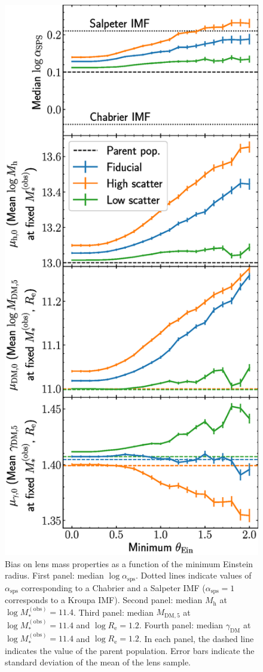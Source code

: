\documentclass{aa}
\def\reff{R_{\mathrm{e}}}
\def\asps{\alpha_{\mathrm{sps}}}
\def\mobs{M_*^{(\mathrm{obs})}}
\def\gammadm{\gamma_{\mathrm{DM}}}
\def\mdmfive{M_{\mathrm{DM}, 5}}
\def\mhalo{M_{\mathrm{h}}}
\begin{document}
\begin{figure}
\includegraphics[width=\columnwidth]{lens_mass_bias.eps}
\caption{
Bias on lens mass properties as a function of the minimum Einstein radius.
First panel: median $\log{\asps}$. Dotted lines indicate values of $\asps$ corresponding to a Chabrier and a Salpeter IMF ($\asps=1$ corresponds to a Kroupa IMF).
Second panel: median $\mhalo$ at $\log{\mobs}=11.4$.
Third panel: median $\mdmfive$ at $\log{\mobs}=11.4$ and $\log{\reff}=1.2$.
Fourth panel: median $\gammadm$ at $\log{\mobs}=11.4$ and $\log{\reff}=1.2$.
In each panel, the dashed line indicates the value of the parent population.
Error bars indicate the standard deviation of the mean of the lens sample.
\label{fig:lensmassbias}
}
\end{figure}
\end{document}
